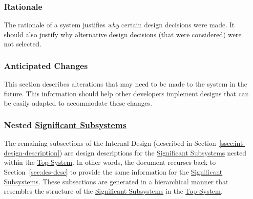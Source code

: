 \documentclass{mcscert}
\newcommand{\topsystemnolink}{Top-System} %
\newcommand{\topsystem}{\hyperref[def:topsystem]{\topsystemnolink{}}}
\newcommand{\sigsubsnolink}{Significant Subsystems} %
\newcommand{\sigsubs}{\hyperref[def:sigsubs]{\sigsubsnolink{}}}
\begin{document}
      \subsubsection{Rationale} 
      \label{par:rationale-description}
      The rationale of a system justifies \emph{why} certain design decisions were made. 
      It should also justify why alternative design decisions (that were considered) were not selected.

      \subsubsection{Anticipated Changes}
      \label{par:ant-changes-description}
      This section describes alterations that may need to be made to the system in the future.
      This information should help other developers implement designs that can be easily adapted to accommodate these changes.
        
      \subsubsection{Nested \sigsubs{}}
      \label{par:nested-subs} 
      The remaining subsections of the Internal Design (described in Section~\ref{ssec:int-design-description}) are design descriptions for the \sigsubs{} nested within the \topsystem{}. 
      In other words, the document recurses back to Section~\ref{sec:des-desc} to provide the same information for the \sigsubs{}. 
      These subsections are generated in a hierarchical manner that resembles the structure of the \sigsubs{} in the \topsystem{}.
\end{document}
